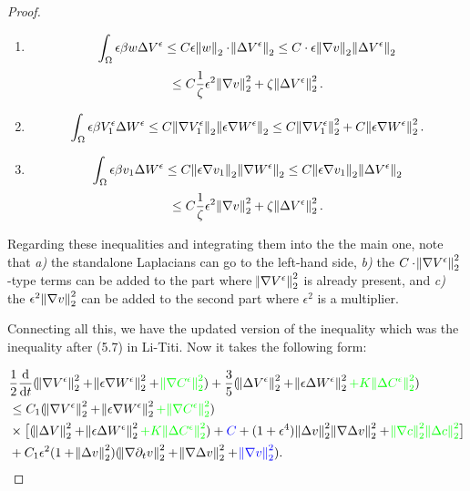 \documentclass[11pt]{article}
\newcommand*\diff{\mathop{}\!\mathrm{d}}
\begin{document}
\begin{proof}
\begin{enumerate}
  \item $$ \int_\Omega \epsilon \beta w \Delta V^\epsilon \leq C \epsilon \norm{w}_2 \cdot \norm{\Delta V^\epsilon}_2 \leq C \cdot \epsilon \norm{\nabla v}_2 \norm{\Delta V^\epsilon}_2 $$
  $$ \leq C \frac{1}{\zeta} \epsilon^2 \norm{\nabla v}_2^2 + \zeta \norm{\Delta V^\epsilon}^2_2.$$
  
  \item $$ \int_\Omega \epsilon \beta V^\epsilon_1 \Delta W^\epsilon \leq C \norm{\nabla V^\epsilon_1}_2 \norm{\epsilon \nabla W^\epsilon}_2 \leq C \norm{\nabla V^\epsilon_1}^2_2 + C \norm{\epsilon \nabla W^\epsilon}^2_2.$$
  
  \item $$ \int_\Omega \epsilon \beta v_1 \Delta W^\epsilon \leq C \norm{\epsilon \nabla v_1}_2 \norm{\nabla W^\epsilon}_2 \leq C \norm{\epsilon \nabla v_1}_2 \norm{\Delta V^\epsilon}_2 $$
  $$ \leq C \frac{1}{\zeta} \epsilon^2 \norm{\nabla v}_2^2 + \zeta \norm{\Delta V^\epsilon}^2_2.$$
  
\end{enumerate}

Regarding these inequalities and integrating them into the the main one, note that \textit{a)} the standalone Laplacians can go to the left-hand side, \textit{b)}  the $C \cdot \norm{\nabla V^\epsilon}^2_2$ -type terms can be added to the part where $\norm{\nabla V^\epsilon}^2_2$ is already present, and \textit{c)} the $\epsilon^2 \norm{\nabla v}^2_2$ can be added to the second part where $\epsilon^2$ is a multiplier.

Connecting all this, we have the updated version of the inequality which was the inequality after (5.7) in Li-Titi. Now it takes the following form:

\begin{equation}
  \begin{split}
    & \frac{1}{2} \frac{\diff}{\diff t} (\norm{\nabla V^\epsilon}^2_2 + \norm{\epsilon \nabla W^\epsilon}^2_2 + \textcolor{green}{\norm{\nabla C^\epsilon}^2_2}) + \frac{3}{5} (\norm{\Delta V^\epsilon}^2_2 + \norm{\epsilon \Delta W^\epsilon}^2_2 \textcolor{green}{+ K \norm{\Delta C^\epsilon}_2^2}) \\
    & \leq C_1 (\norm{\nabla V^\epsilon}^2_2 + \norm{\epsilon \nabla W^\epsilon}^2_2 \textcolor{green}{+ \norm{\nabla C^\epsilon}^2_2}) \\
    & \times \big [ (\norm{\Delta V}^2_2 + \norm{\epsilon \Delta W^\epsilon}^2_2 \textcolor{green}{+ K \norm{\Delta C^\epsilon}_2^2}) + \textcolor{blue}{C}+ (1+ \epsilon^4) \norm{\Delta v}^2_2 \norm{\nabla \Delta v}^2_2 + \textcolor{green}{\norm{\nabla c}^2_2 \norm{\Delta c}^2_2} \big ] \\
    & + C_1 \epsilon^2 (1 + \norm{\Delta v}^2_2) (\norm{\nabla \partial_t v}^2_2 + \norm{\nabla \Delta v}^2_2 + \textcolor{blue}{\norm{\nabla v}_2^2}).
  \end{split}
\end{equation}


\end{proof}
\end{document}
